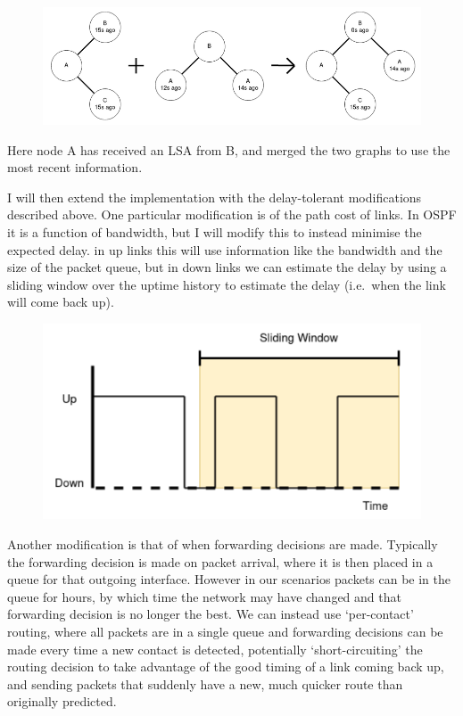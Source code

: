 \documentclass[withindex,glossary,openany]{cam-thesis}
\begin{document}
\begin{figure}[H]
  \centering
  \includegraphics[width=0.9\linewidth]{proposal_2}
\end{figure}

Here node A has received an LSA from B, and merged the two graphs to use the most recent information.

I will then extend the implementation with the delay-tolerant modifications described above. One particular modification is of the path cost of links. In OSPF it is a function of bandwidth, but I will modify this to instead minimise the expected delay. in up links this will use information like the bandwidth and the size of the packet queue, but in down links we can estimate the delay by using a sliding window over the uptime history to estimate the delay (i.e.\ when the link will come back up).

\begin{figure}[H]
  \centering
  \includegraphics[width=0.6\linewidth]{proposal_3}
\end{figure}

Another modification is that of when forwarding decisions are made. Typically the forwarding decision is made on packet arrival, where it is then placed in a queue for that outgoing interface. However in our scenarios packets can be in the queue for hours, by which time the network may have changed and that forwarding decision is no longer the best. We can instead use `per-contact’ routing, where all packets are in a single queue and forwarding decisions can be made every time a new contact is detected, potentially `short-circuiting’ the routing decision to take advantage of the good timing of a link coming back up, and sending packets that suddenly have a new, much quicker route than originally predicted.
\end{document}
